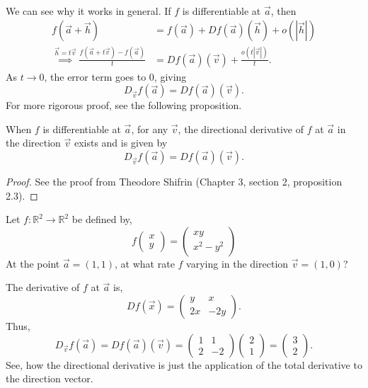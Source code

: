 ~\\
We can see why it works in general.
If $f$ is differentiable at $\vec a$, then
\begin{align*}
f(\vec a+\vec h)&=f(\vec a)+Df(\vec a)(\vec h)+o(|\vec h|)\\
\stackrel{\vec h=t\vec v}{\implies}\frac{f(\vec a+t\vec v)-f(\vec a)}{t}&=Df(\vec a)(\vec v)+\frac{o(t|\vec v|)}{t}.
\end{align*}
As $t\to0$, the error term goes to $0$, giving
\[
D_{\vec v}f(\vec a)=Df(\vec a)(\vec v).
\]
For more rigorous proof, see the following proposition.
\begin{proposition}
  When $f$ is differentiable at $\vec a$, for any $\vec v$, 
  the directional derivative of $f$ at $\vec a$ in the direction $\vec v$ exists and is given by
  \[
  D_{\vec v}f(\vec a) = Df(\vec a)(\vec v).
  \]    
\end{proposition}
\begin{proof}
  See the proof from Theodore Shifrin \cite{shifrin} (Chapter 3, section 2, proposition 2.3). 
\end{proof}
\begin{example}
  Let $f:\mathbb R^2\to \mathbb R^2$ be defined by,
  \[
  f\begin{pmatrix}
    x\\
    y
  \end{pmatrix}=\begin{pmatrix}
    xy\\
    x^2-y^2
  \end{pmatrix}
  \]
  At the point $\vec a=(1,1)$, at what rate $f$ varying in the
  direction $\vec v=(1,0)$?
\end{example}
The derivative of $f$ at $\vec a$ is,
\[
Df(\vec x)=\begin{pmatrix}
y & x\\
2x & -2y
\end{pmatrix}.
\]
Thus, 
\[
D_{\vec v}f(\vec a)=Df(\vec a)(\vec v)=\begin{pmatrix}
1 & 1\\
2 & -2
\end{pmatrix}\begin{pmatrix}
2\\
1
\end{pmatrix}=\begin{pmatrix}
3\\
2
\end{pmatrix}.
\]
See, how the directional derivative is just the application of the total derivative to the direction vector.
